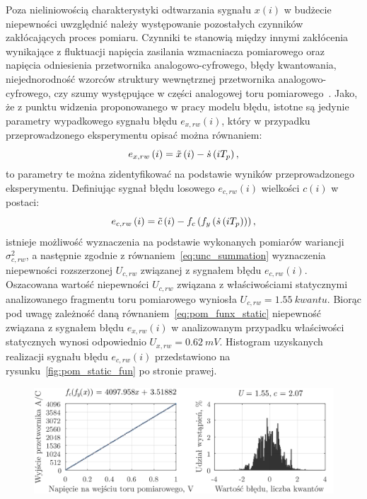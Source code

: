 Poza nieliniowością charakterystyki odtwarzania sygnału $x(i)$ w budżecie niepewności uwzględnić należy występowanie pozostałych czynników zakłócających proces pomiaru. Czynniki te stanowią między innymi zakłócenia wynikające z fluktuacji napięcia zasilania wzmacniacza pomiarowego oraz napięcia odniesienia przetwornika analogowo-cyfrowego, błędy kwantowania, niejednorodność wzorców struktury wewnętrznej przetwornika analogowo-cyfrowego, czy szumy występujące w części analogowej toru pomiarowego~\cite{stm_adc}. Jako, że z punktu widzenia proponowanego w pracy modelu błędu, istotne są jedynie parametry wypadkowego sygnału błędu $e_{x,rw}(i)$, który w przypadku przeprowadzonego eksperymentu opisać można równaniem:
\begin{equation}
e_{x,rw} \left(i\right) = \tilde{x} \left(i\right) - \dot{s} \left(iT_{p}\right) \label{eq:pom_funx_error},
\end{equation}
to parametry te można zidentyfikować na podstawie wyników przeprowadzonego eksperymentu. Definiując sygnał błędu losowego $e_{c,rw}(i)$ wielkości $c(i)$ w postaci:
\begin{equation}
e_{c,rw} \left(i\right) = \tilde{c} \left(i\right) - f_{c} \left(f_{y} \left(\dot{s} \left(iT_{p}\right)\right)\right) \label{eq:pom_func_error},
\end{equation}
istnieje możliwość wyznaczenia na podstawie wykonanych pomiarów wariancji $\sigma_{c,rw}^{2}$, a następnie zgodnie z równaniem~\eqref{eq:unc_summation} wyznaczenia niepewności rozszerzonej $U_{c,rw}$ związanej z sygnałem błędu $e_{c,rw}(i)$. Oszacowana wartość niepewności $U_{c,rw}$ związana z właściwościami statycznymi analizowanego fragmentu toru pomiarowego wyniosła $U_{c,rw} = \qty{1.55}{kwantu}$. Biorąc pod uwagę zależność daną równaniem~\eqref{eq:pom_funx_static} niepewność związana z sygnałem błędu $e_{x,rw}(i)$ w analizowanym przypadku właściwości statycznych wynosi odpowiednio $U_{x,rw} = \qty{0.62}{mV}$. Histogram uzyskanych realizacji sygnału błędu $e_{c,rw}(i)$ przedstawiono na rysunku~\ref{fig:pom_static_fun} po stronie prawej.

\begin{figure}[htb!]
\begin{center}
\includegraphics{obrazki/static_adcout}
\end{center}
\end{figure}

